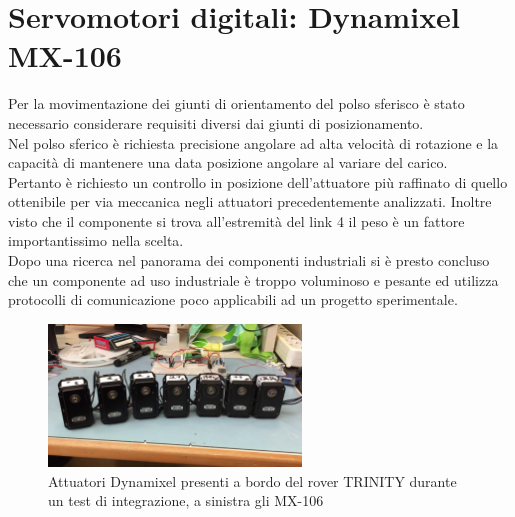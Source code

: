 \documentclass[%
corpo=11pt,
twoside,
 stile=classica,
oldstyle,
greek,%
]{toptesi}
\begin{document}
	
		
	\section{Servomotori digitali: Dynamixel MX-106}
	Per la movimentazione dei giunti di orientamento del polso sferisco è stato necessario considerare requisiti diversi dai giunti di posizionamento.\\
	 Nel polso sferico è richiesta precisione angolare ad alta velocità di rotazione e la capacità di mantenere una data posizione angolare al variare del carico.\\
	  Pertanto è richiesto un controllo in posizione dell'attuatore più raffinato di quello ottenibile per via meccanica negli attuatori precedentemente analizzati. Inoltre visto che il componente si trova all'estremità del link 4 il peso è un fattore importantissimo nella scelta. \\
	Dopo una ricerca nel panorama dei componenti industriali si è presto concluso che un componente ad uso industriale è troppo voluminoso e pesante ed utilizza protocolli di comunicazione poco applicabili ad un progetto sperimentale. 
	
	\begin{figure}
		\centering
		\includegraphics[width=0.6\textwidth]{image/dynamixel.png}
		\caption{Attuatori Dynamixel presenti a bordo del rover TRINITY durante un test di integrazione, a sinistra gli MX-106}
		\label{fig:MX160}
	\end{figure}
\end{document}
